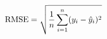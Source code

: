 \documentclass[preview]{standalone}
\begin{document}
\begin{align*}
\special{dvisvgm:raw <g id='unique000'>}\text{RMSE} = \sqrt{\frac{1}{n}\sum_{i=1}^{n}(y_i - \hat{y}_i)^2}\special{dvisvgm:raw </g>}
\end{align*}
\end{document}
